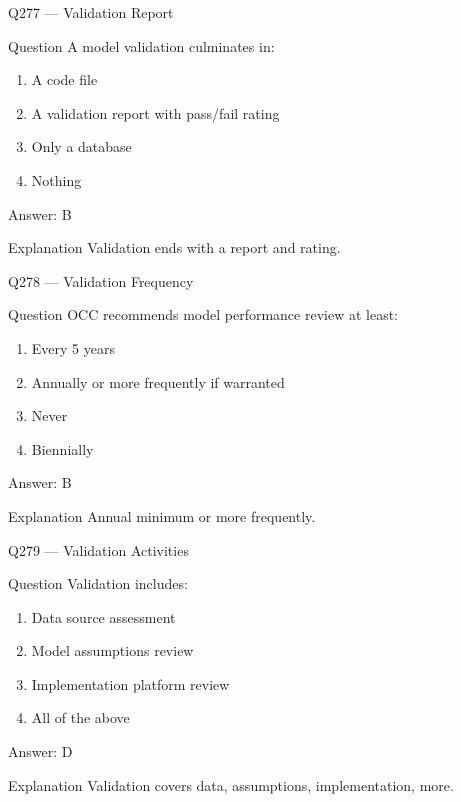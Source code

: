 \documentclass[aspectratio=169,8pt]{beamer}
\begin{document}
\begin{frame}{Q277 --- Validation Report}
\begin{block}{Question}
A model validation culminates in:
\begin{enumerate}
\item A code file
\item A validation report with pass/fail rating
\item Only a database
\item Nothing
\end{enumerate}
\end{block}
\begin{exampleblock}{Answer: B}\end{exampleblock}
\begin{block}{Explanation}
Validation ends with a report and rating.
\end{block}
\end{frame}

\begin{frame}{Q278 --- Validation Frequency}
\begin{block}{Question}
OCC recommends model performance review at least:
\begin{enumerate}
\item Every 5 years
\item Annually or more frequently if warranted
\item Never
\item Biennially
\end{enumerate}
\end{block}
\begin{exampleblock}{Answer: B}\end{exampleblock}
\begin{block}{Explanation}
Annual minimum or more frequently.
\end{block}
\end{frame}

\begin{frame}{Q279 --- Validation Activities}
\begin{block}{Question}
Validation includes:
\begin{enumerate}
\item Data source assessment
\item Model assumptions review
\item Implementation platform review
\item All of the above
\end{enumerate}
\end{block}
\begin{exampleblock}{Answer: D}\end{exampleblock}
\begin{block}{Explanation}
Validation covers data, assumptions, implementation, more.
\end{block}
\end{frame}
\end{document}
